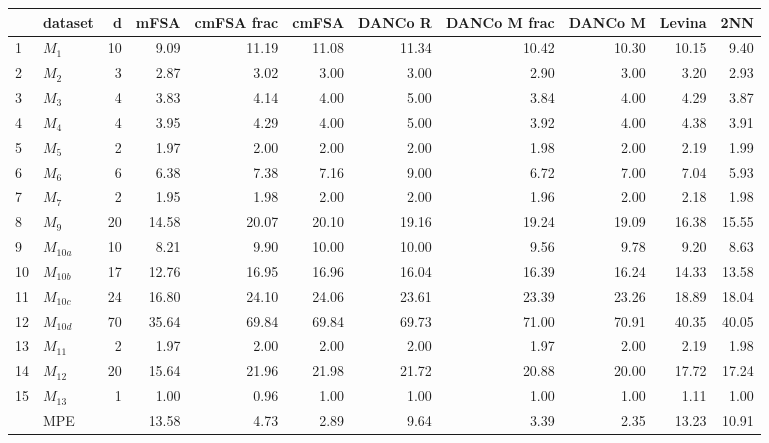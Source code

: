 \begin{tabular}{llrrrrrrrrr}
\toprule
{} &    dataset &   d &   mFSA &  cmFSA frac &  cmFSA &  DANCo R &  DANCo M frac &  DANCo M &  Levina &    2NN \\
\midrule
1  &      $M_1$ &  10 &   9.09 &       11.19 &  11.08 &    11.34 &         10.42 &    10.30 &   10.15 &   9.40 \\
2  &      $M_2$ &   3 &   2.87 &        3.02 &   3.00 &     3.00 &          2.90 &     3.00 &    3.20 &   2.93 \\
3  &      $M_3$ &   4 &   3.83 &        4.14 &   4.00 &     5.00 &          3.84 &     4.00 &    4.29 &   3.87 \\
4  &      $M_4$ &   4 &   3.95 &        4.29 &   4.00 &     5.00 &          3.92 &     4.00 &    4.38 &   3.91 \\
5  &      $M_5$ &   2 &   1.97 &        2.00 &   2.00 &     2.00 &          1.98 &     2.00 &    2.19 &   1.99 \\
6  &      $M_6$ &   6 &   6.38 &        7.38 &   7.16 &     9.00 &          6.72 &     7.00 &    7.04 &   5.93 \\
7  &      $M_7$ &   2 &   1.95 &        1.98 &   2.00 &     2.00 &          1.96 &     2.00 &    2.18 &   1.98 \\
8  &      $M_9$ &  20 &  14.58 &       20.07 &  20.10 &    19.16 &         19.24 &    19.09 &   16.38 &  15.55 \\
9  &  $M_{10a}$ &  10 &   8.21 &        9.90 &  10.00 &    10.00 &          9.56 &     9.78 &    9.20 &   8.63 \\
10 &  $M_{10b}$ &  17 &  12.76 &       16.95 &  16.96 &    16.04 &         16.39 &    16.24 &   14.33 &  13.58 \\
11 &  $M_{10c}$ &  24 &  16.80 &       24.10 &  24.06 &    23.61 &         23.39 &    23.26 &   18.89 &  18.04 \\
12 &  $M_{10d}$ &  70 &  35.64 &       69.84 &  69.84 &    69.73 &         71.00 &    70.91 &   40.35 &  40.05 \\
13 &   $M_{11}$ &   2 &   1.97 &        2.00 &   2.00 &     2.00 &          1.97 &     2.00 &    2.19 &   1.98 \\
14 &   $M_{12}$ &  20 &  15.64 &       21.96 &  21.98 &    21.72 &         20.88 &    20.00 &   17.72 &  17.24 \\
15 &   $M_{13}$ &   1 &   1.00 &        0.96 &   1.00 &     1.00 &          1.00 &     1.00 &    1.11 &   1.00 \\
\bottomrule
&MPE& & 13.58 & 4.73& 2.89& 9.64&3.39&2.35&13.23&10.91
\end{tabular}

